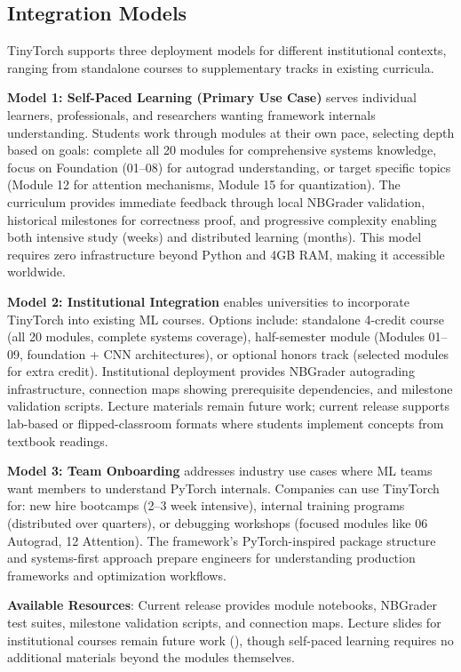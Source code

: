 \documentclass[10pt,twocolumn]{article}
\begin{document}
\subsection{Integration Models}
\label{subsec:integration}

TinyTorch supports three deployment models for different institutional contexts, ranging from standalone courses to supplementary tracks in existing curricula.

\textbf{Model 1: Self-Paced Learning (Primary Use Case)} serves individual learners, professionals, and researchers wanting framework internals understanding. Students work through modules at their own pace, selecting depth based on goals: complete all 20 modules for comprehensive systems knowledge, focus on Foundation (01--08) for autograd understanding, or target specific topics (Module 12 for attention mechanisms, Module 15 for quantization). The curriculum provides immediate feedback through local NBGrader validation, historical milestones for correctness proof, and progressive complexity enabling both intensive study (weeks) and distributed learning (months). This model requires zero infrastructure beyond Python and 4GB RAM, making it accessible worldwide.

\textbf{Model 2: Institutional Integration} enables universities to incorporate TinyTorch into existing ML courses. Options include: standalone 4-credit course (all 20 modules, complete systems coverage), half-semester module (Modules 01--09, foundation + CNN architectures), or optional honors track (selected modules for extra credit). Institutional deployment provides NBGrader autograding infrastructure, connection maps showing prerequisite dependencies, and milestone validation scripts. Lecture materials remain future work; current release supports lab-based or flipped-classroom formats where students implement concepts from textbook readings.

\textbf{Model 3: Team Onboarding} addresses industry use cases where ML teams want members to understand PyTorch internals. Companies can use TinyTorch for: new hire bootcamps (2--3 week intensive), internal training programs (distributed over quarters), or debugging workshops (focused modules like 06 Autograd, 12 Attention). The framework's PyTorch-inspired package structure and systems-first approach prepare engineers for understanding production frameworks and optimization workflows.

\textbf{Available Resources}: Current release provides module notebooks, NBGrader test suites, milestone validation scripts, and connection maps. Lecture slides for institutional courses remain future work (), though self-paced learning requires no additional materials beyond the modules themselves.
\end{document}

